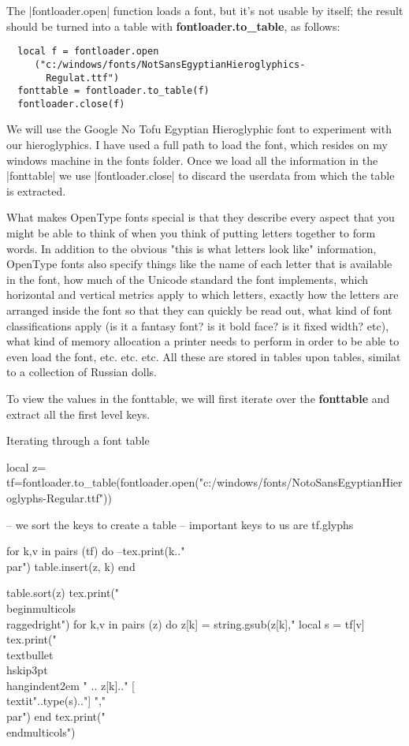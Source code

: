 The |fontloader.open| function loads a font, but it's not usable by itself; the result should be turned into a table with
\textbf{fontloader.to\_table}, as follows:

\begin{verbatim}
  local f = fontloader.open
     ("c:/windows/fonts/NotSansEgyptianHieroglyphics-
       Regulat.ttf")
  fonttable = fontloader.to_table(f)
  fontloader.close(f)
\end{verbatim}

We will use the Google No Tofu Egyptian Hieroglyphic font to experiment with our hieroglyphics. I have used a full path to load the font, which resides on my windows machine in the fonts folder. Once we load all the information in the |fonttable| we use |fontloader.close| to discard the userdata from which the table is extracted. 

What makes OpenType fonts special is that they describe every aspect that you might be able to think of when you think of putting letters together to form words. In addition to the obvious "this is what letters look like" information, OpenType fonts also specify things like the name of each letter that is available in the font, how much of the Unicode standard the font implements, which horizontal and vertical metrics apply to which letters, exactly how the letters are arranged inside the font so that they can quickly be read out, what kind of font classifications apply (is it a fantasy font? is it bold face? is it fixed width? etc), what kind of memory allocation a printer needs to perform in order to be able to even load the font, etc. etc. etc. All these are stored in tables upon tables, similat to a collection of Russian dolls.

To view the values in the fonttable, we will first iterate over the \textbf{fonttable} and extract all the first level keys.

\begin{texexample}{Iterating through a font table}{}
\begin{luacode*}
local z={}
tf=fontloader.to_table(fontloader.open("c:/windows/fonts/NotoSansEgyptianHieroglyphs-Regular.ttf"))

-- we sort the keys to create a table
-- important keys to us are tf.glyphs

for k,v in pairs (tf) do
   --tex.print(k.."\\par")
   table.insert(z, k)
end

table.sort(z)
tex.print("\\begin{multicols}{3}\\raggedright")
for k,v in pairs (z) do
   z[k] = string.gsub(z[k],"%
   local s = tf[v]
   tex.print("\\textbullet\\hskip3pt\\hangindent2em " .. z[k].." [\\textit{"..type(s).."}] ","\\par")
end
tex.print("\\end{multicols}")
\end{luacode*}
\end{texexample}

